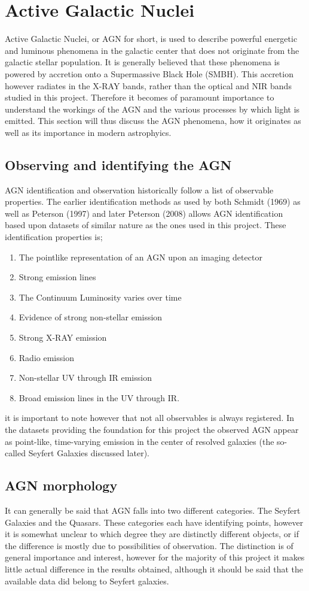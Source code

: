 \documentclass[a4paper, 12pt, twoside]{article}
\begin{document}
\section{Active Galactic Nuclei}
Active Galactic Nuclei, or AGN for short, is used to describe powerful energetic and luminous phenomena in the galactic center that does not originate from the galactic stellar population. It is generally believed that these phenomena is powered by accretion onto a Supermassive Black Hole (SMBH). This accretion however radiates in the X-RAY bands, rather than the optical and NIR bands studied in this project. Therefore it becomes of paramount importance to understand the workings of the AGN and the various processes by which light is emitted. This section will thus discuss the AGN phenomena, how it originates as well as its importance in modern astrophyics.

\subsection{Observing and identifying the AGN}
AGN identification and observation historically follow a list of observable properties. The earlier identification methods as used by both Schmidt (1969) as well as Peterson (1997) and later Peterson (2008) allows AGN identification based upon datasets of similar nature as the ones used in this project. These identification properties is; 
\begin{enumerate}
\item The pointlike representation of an AGN upon an imaging detector
\item Strong emission lines
\item The Continuum Luminosity varies over time
\item Evidence of strong non-stellar emission
\item Strong X-RAY emission
\item Radio emission
\item Non-stellar UV through IR emission
\item Broad emission lines in the UV through IR.
\end{enumerate}
it is important to note however that not all observables is always registered. In the datasets providing the foundation for this project the observed AGN appear as point-like, time-varying emission in the center of resolved galaxies (the so-called Seyfert Galaxies discussed later). 
\\
\subsection{AGN morphology}
It can generally be said that AGN falls into two different categories. The Seyfert Galaxies and the Quasars. These categories each have identifying points, however it is somewhat unclear to which degree they are distinctly different objects, or if the difference is mostly due to possibilities of observation. The distinction is of general importance and interest, however for the majority of this project it makes little actual difference in the results obtained, although it should be said that the available data did belong to Seyfert galaxies. 
\end{document}

